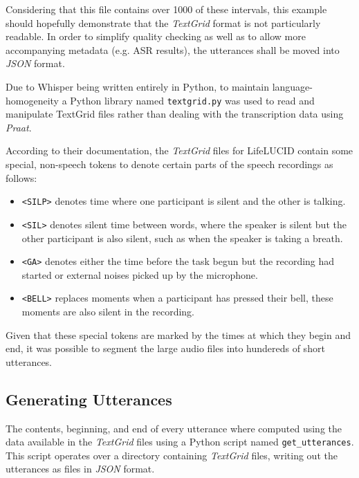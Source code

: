 Considering that this file contains over 1000 of these intervals, this example should hopefully demonstrate that the \emph{TextGrid} format is not particularly readable.
In order to simplify quality checking as well as to allow more accompanying metadata (e.g. ASR results), the utterances shall be moved into \emph{JSON} format.

Due to Whisper being written entirely in Python, to maintain language-homogeneity a Python library named \texttt{textgrid.py}\cite{textgridpy} was used to read and manipulate TextGrid files rather than dealing with the transcription data using \emph{Praat}.

According to their documentation, the \emph{TextGrid} files for LifeLUCID\cite{lifelucid} contain some special, non-speech tokens to denote certain parts of the speech recordings as follows:

\begin{itemize}
  \item \texttt{<SILP>} denotes time where one participant is silent and the other is talking.
  \item \texttt{<SIL>} denotes silent time between words, where the speaker is silent but the other participant is also silent, such as when the speaker is taking a breath.
  \item \texttt{<GA>} denotes either the time before the task begun but the recording had started or external noises picked up by the microphone. 
  \item \texttt{<BELL>} replaces moments when a participant has pressed their bell, these moments are also silent in the recording.
\end{itemize}

Given that these special tokens are marked by the times at which they begin and end, it was possible to segment the large audio files into hundereds of short utterances.

\subsection{Generating Utterances}

The contents, beginning, and end of every utterance where computed using the data available in the \emph{TextGrid} files using a Python script named \texttt{get\_utterances}.
This script operates over a directory containing \emph{TextGrid} files, writing out the utterances as files in \emph{JSON} format.

